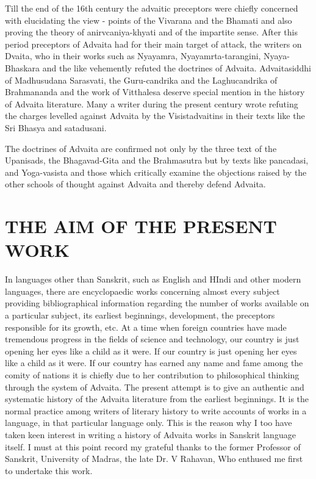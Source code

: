 Till the end of the 16th century the advaitic preceptors were chiefly concerned with elucidating the view - points of the Vivarana and the Bhamati and also proving the theory of anirvcaniya-khyati and of the impartite sense. After this period preceptors of Advaita had for their main target of attack, the writers on Dvaita, who in their works such as Nyayamra, Nyayamrta-tarangini, Nyaya-Bhaskara and the like vehemently refuted the doctrines of Advaita. Advaitasiddhi of Madhusudana Sarasvati, the Guru-candrika and the Laghucandrika of Brahmananda and the work of Vitthalesa deserve special mention in the history of Advaita literature. Many a writer during the present century wrote refuting the charges levelled against Advaita by the Visistadvaitins in their texts like the Sri Bhasya and satadusani.

The doctrines of Advaita are confirmed not only by the three text of the Upanisads, the Bhagavad-Gita and the Brahmasutra but by texts like pancadasi, and Yoga-vasista and those which critically examine the objections raised by the other schools of thought against Advaita and thereby defend Advaita. 

\section {THE AIM OF THE PRESENT WORK}
In languages other than Sanskrit, such as English and HIndi and other modern languages, there are encyclopaedic works concerning almost every subject providing bibliographical information regarding the number of works available on a particular subject, its earliest beginnings, development, the preceptors responsible for its growth, etc. At a time when foreign countries have made tremendous progress in the fields of science and technology, our country is just opening her eyes like a child as it were. If our country is just opening her eyes like a child as it were. If our country has earned any name and fame among the comity of nations it is chiefly due to her contribution to philosophical thinking through the system of Advaita. The present attempt is to give an authentic and systematic history of the Advaita literature from the earliest beginnings. It is the normal practice among writers of literary history to write accounts of works in a language, in that particular language only. This is the reason why I too have taken keen interest in writing a history of Advaita works in Sanskrit language itself. I must at this point record my grateful thanks to the former Professor of Sanskrit, University of Madras, the late Dr. V Rahavan, Who enthused me first to undertake this work. 

